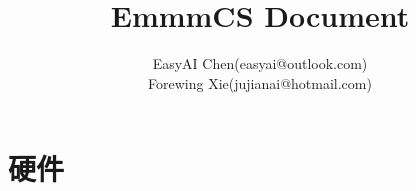 \documentclass[10pt,fancyhdr,UTF8]{ctexbook}
\title{EmmmCS Document}
\author{
        EasyAI Chen(easyai@outlook.com)\\
        Forewing Xie(jujianai@hotmail.com)
    }
\begin{document}
\begin{sloppypar}
\maketitle
\tableofcontents
\mainmatter
\part{硬件}




\end{sloppypar}
\end{document}
